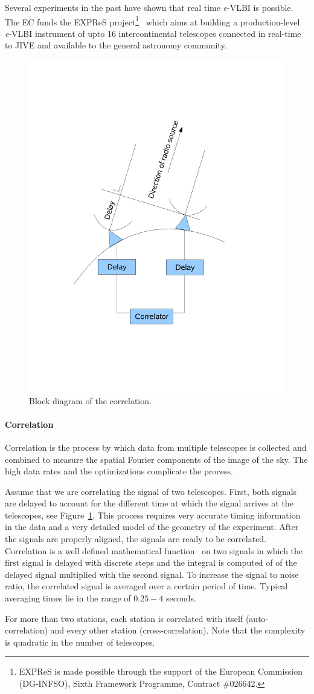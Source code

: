 Several experiments in the past have shown that real time {\it e}-VLBI
is possible. The EC funds the EXPReS project\footnote{EXPReS is made
  possible through the support of the European Commission (DG-INFSO),
  Sixth Framework Programme, Contract \#026642.}~\cite{EXPReS} which
aims at building a production-level {\it e}-VLBI instrument of upto 16
intercontinental telescopes connected in real-time to JIVE and
available to the general astronomy community.

\begin{figure}
  \centering
  \includegraphics[width=.5\textwidth]
  {img/VLBI}
  \caption{Block diagram of the correlation.}
  \label{fig:correlation_diagram}
\end{figure}
\paragraph{Correlation}
Correlation is the process by which data from multiple telescopes is
collected and combined to measure the spatial Fourier components of
the image of the sky. The high data rates and the optimizations
complicate the process.

Assume that we are correlating the signal of two telescopes. First,
both signals are delayed to account for the different time at which
the signal arrives at the telescopes, see
Figure~\ref{fig:correlation_diagram}.  This process requires very
accurate timing information in the data and a very detailed model of
the geometry of the experiment. After the signals are properly
aligned, the signals are ready to be correlated. Correlation is a well
defined mathematical function~\cite{def_correlation} on two signals in
which the first signal is delayed with discrete steps and the integral
is computed of of the delayed signal multiplied with the second
signal. To increase the signal to noise ratio, the correlated signal
is averaged over a certain period of time. Typical averaging times lie
in the range of $0.25-4$ seconds.

For more than two stations, each station is correlated with itself
(auto-correlation) and every other station (cross-correlation). Note
that the complexity is quadratic in the number of telescopes.


